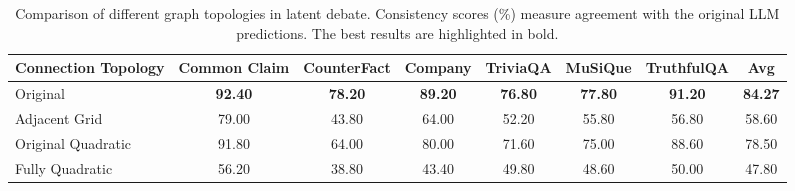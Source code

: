\begin{table}[t]
    \centering
    \tiny
    \setlength{\tabcolsep}{2.8mm}
    \begin{tabular}{lccccccc}
        \toprule
        \textbf{Connection Topology}
        & \textbf{Common Claim} & \textbf{CounterFact} & \textbf{Company}
        & \textbf{TriviaQA} & \textbf{MuSiQue} & \textbf{TruthfulQA} & \textbf{Avg} \\
        \midrule
        Original & \textbf{92.40} & \textbf{78.20} & \textbf{89.20} & \textbf{76.80} & \textbf{77.80} & \textbf{91.20} & \textbf{84.27} \\
        Adjacent Grid & 79.00 & 43.80 & 64.00 & 52.20 & 55.80 & 56.80 & 58.60 \\
        Original Quadratic & 91.80 & 64.00 & 80.00 & 71.60 & 75.00 & 88.60 & 78.50 \\
        Fully Quadratic & 56.20 & 38.80 & 43.40 & 49.80 & 48.60 & 50.00 & 47.80 \\
        \bottomrule
    \end{tabular}
    \caption{Comparison of different graph topologies in latent debate. Consistency scores (\%) measure agreement with the original LLM predictions. The best results are highlighted in bold.}
    \label{tab:connection_topology}
\end{table}
